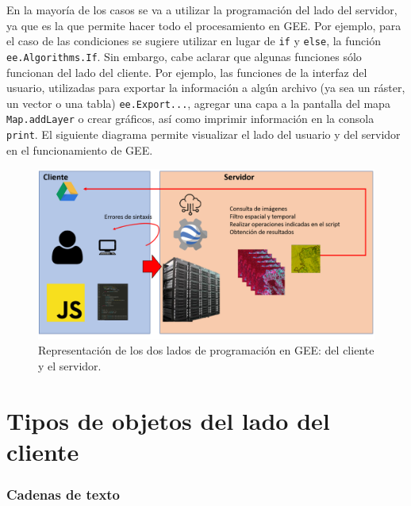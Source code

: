 \documentclass[
  12pt,
  letterpaper,
  twoside]{book}
\begin{document}
En la mayoría de los casos se va a utilizar la programación del lado del servidor, ya que es la que permite hacer todo el procesamiento en GEE. Por ejemplo, para el caso de las condiciones se sugiere utilizar en lugar de \texttt{if} y \texttt{else}, la función \texttt{ee.Algorithms.If}. Sin embargo, cabe aclarar que algunas funciones sólo funcionan del lado del cliente. Por ejemplo, las funciones de la interfaz del usuario, utilizadas para exportar la información a algún archivo (ya sea un ráster, un vector o una tabla) \texttt{ee.Export...}, agregar una capa a la pantalla del mapa \texttt{Map.addLayer} o crear gráficos, así como imprimir información en la consola \texttt{print}. El siguiente diagrama permite visualizar el lado del usuario y del servidor en el funcionamiento de GEE.

\begin{figure}[btp]

{\centering \includegraphics[width=1\linewidth]{Img/daigFunc} 

}

\caption{Representación de los dos lados de programación en GEE: del cliente y el servidor.}\label{fig:unnamed-chunk-43}
\end{figure}

\hypertarget{tipos-de-objetos-del-lado-del-cliente}{%
\section{Tipos de objetos del lado del cliente}\label{tipos-de-objetos-del-lado-del-cliente}}

\hypertarget{cadenas-de-texto}{%
\subsubsection*{Cadenas de texto}\label{cadenas-de-texto}}
\end{document}
